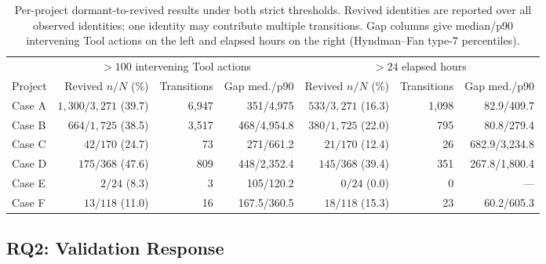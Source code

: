 \documentclass[letterpaper]{article}
\begin{document}
\begin{table}[t]
  \centering
  \footnotesize
  \setlength{\tabcolsep}{3.5pt}
  \begin{tabular}{@{}lrrr rrr@{}}
    \toprule
    & \multicolumn{3}{c}{$>100$ intervening Tool actions}
    & \multicolumn{3}{c}{$>24$ elapsed hours} \\
    \cmidrule(lr){2-4}\cmidrule(l){5-7}
    Project & Revived $n/N$ (\%) & Transitions & Gap med./p90
            & Revived $n/N$ (\%) & Transitions & Gap med./p90 \\
    \midrule
    Case A
      & $1{,}300/3{,}271$ (39.7) & 6,947 & 351/4,975
      & $533/3{,}271$ (16.3) & 1,098 & 82.9/409.7 \\
    Case B
      & $664/1{,}725$ (38.5) & 3,517 & 468/4,954.8
      & $380/1{,}725$ (22.0) & 795 & 80.8/279.4 \\
    Case C
      & $42/170$ (24.7) & 73 & 271/661.2
      & $21/170$ (12.4) & 26 & 682.9/3,234.8 \\
    Case D
      & $175/368$ (47.6) & 809 & 448/2,352.4
      & $145/368$ (39.4) & 351 & 267.8/1,800.4 \\
    Case E
      & $2/24$ (8.3) & 3 & 105/120.2
      & $0/24$ (0.0) & 0 & --- \\
    Case F
      & $13/118$ (11.0) & 16 & 167.5/360.5
      & $18/118$ (15.3) & 23 & 60.2/605.3 \\
    \bottomrule
  \end{tabular}
  \caption{Per-project dormant-to-revived results under both strict
  thresholds.  Revived identities are reported over all observed identities;
  one identity may contribute multiple transitions.  Gap columns give
  median/p90 intervening Tool actions on the left and elapsed hours on the
  right (Hyndman--Fan type-7 percentiles).}
  \label{tab:rq1-dormancy}
\end{table}

\subsection{RQ2: Validation Response}
\end{document}
